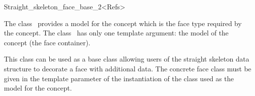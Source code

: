

\begin{ccRefClass}{Straight_skeleton_face_base_2<Refs>}


\ccDefinition

The class \ccRefName\ provides a model for the
 concept which is the face
type required by the 
concept. The class \ccRefName\ has only one template argument: the model of the  concept (the face container).

This class can be used as a base class allowing users of the straight skeleton data structure to decorate a face with additional data. The concrete face class must be given in the  template parameter of the instantiation of the  class used as the model for the  concept.


\ccIsModel
{}\\
\\
\\
\\

\ccSeeAlso
{}\\
\\
\\
\\
\\

\end{ccRefClass}


